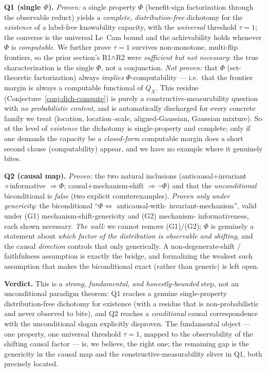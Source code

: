 \begin{remark}\label{rmk:dich-scope}
\textbf{Q1 (single $\Phi$).} \emph{Proven:} a single property $\Phi$ (benefit-sign
factorization through the observable reduct) yields a \emph{complete, distribution-free}
dichotomy for the \emph{existence} of a label-free knowability capacity, with the
\emph{universal} threshold $\tau=1$; the converse is the universal Le~Cam bound and the
achievability holds whenever $\Phi$ is \emph{computable}. We further prove $\tau=1$
survives non-monotone, multi-flip frontiers, so the prior section's R1$\wedge$R2 were
\emph{sufficient but not necessary}: the true characterization is the single $\Phi$, not
a conjunction. \emph{Not proven:} that $\Phi$ (set-theoretic factorization) always
\emph{implies} $\Phi$-computability --- i.e.\ that the frontier margin is always a
computable functional of $Q_X$. This residue (Conjecture~\ref{conj:dich-compute}) is
purely a constructive-measurability question with \emph{no probabilistic content}, and
is automatically discharged for every concrete family we treat (location,
location--scale, aligned-Gaussian, Gaussian mixture). So at the level of \emph{existence}
the dichotomy is single-property and complete; only if one demands the capacity be a
\emph{closed-form} computable margin does a short second clause (computability) appear,
and we have no example where it genuinely bites.

\textbf{Q2 (causal map).} \emph{Proven:} the two natural inclusions (anticausal+invariant
+informative $\Rightarrow\Phi$; causal+mechanism-shift $\Rightarrow\neg\Phi$) and that
the \emph{unconditional} biconditional is \emph{false} (two explicit counterexamples).
\emph{Proven only under genericity:} the biconditional ``$\Phi\iff$ anticausal-with-
invariant-mechanism'', valid under (G1) mechanism-shift-genericity and (G2) mechanism-
informativeness, each shown necessary. \emph{The wall:} we cannot remove (G1)/(G2);
$\Phi$ is genuinely a statement about \emph{which factor of the distribution is
observable and shifting}, and the causal \emph{direction} controls that only
generically. A non-degenerate-shift / faithfulness assumption is exactly the bridge, and
formalizing the weakest such assumption that makes the biconditional exact (rather than
generic) is left open.

\textbf{Verdict.} This is a \emph{strong, fundamental, and honestly-bounded} step, not an
unconditional paradigm theorem: Q1 reaches a genuine single-property distribution-free
dichotomy for existence (with a residue that is non-probabilistic and never observed to
bite), and Q2 reaches a \emph{conditional} causal correspondence with the unconditional
slogan explicitly disproven. The fundamental object --- one property, one universal
threshold $\tau=1$, mapped to the observability of the shifting causal factor --- is, we
believe, the right one; the remaining gap is the genericity in the causal map and the
constructive-measurability sliver in Q1, both precisely located.
\end{remark}
